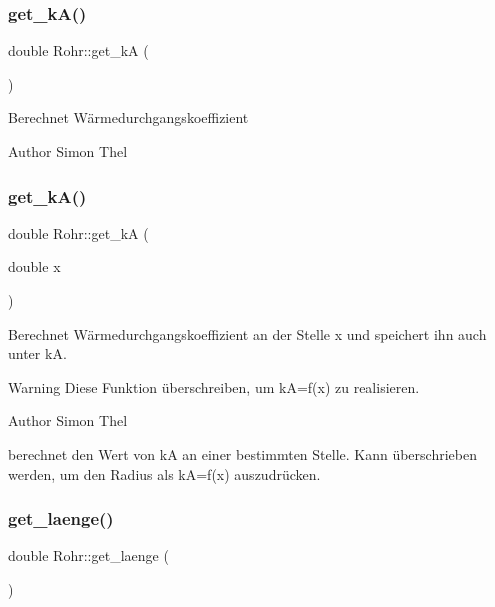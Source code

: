 \subsubsection{\texorpdfstring{get\+\_\+k\+A()}{get\_kA()}\hspace{0.1cm}{\footnotesize\ttfamily [1/2]}}
{\footnotesize\ttfamily double Rohr\+::get\+\_\+kA (\begin{DoxyParamCaption}{ }\end{DoxyParamCaption})}

Berechnet Wärmedurchgangskoeffizient \begin{DoxyAuthor}{Author}
Simon Thel 
\end{DoxyAuthor}
\mbox{\label{class_rohr_a07985e6f4a1d9dc8bfcfe2e5cc9f2a60}} 
\subsubsection{\texorpdfstring{get\+\_\+k\+A()}{get\_kA()}\hspace{0.1cm}{\footnotesize\ttfamily [2/2]}}
{\footnotesize\ttfamily double Rohr\+::get\+\_\+kA (\begin{DoxyParamCaption}\item[{double}]{x }\end{DoxyParamCaption})}



Berechnet Wärmedurchgangskoeffizient an der Stelle x und speichert ihn auch unter kA. 

\begin{DoxyWarning}{Warning}
Diese Funktion überschreiben, um kA=f(x) zu realisieren. 
\end{DoxyWarning}
\begin{DoxyAuthor}{Author}
Simon Thel 
\end{DoxyAuthor}
berechnet den Wert von kA an einer bestimmten Stelle. Kann überschrieben werden, um den Radius als kA=f(x) auszudrücken.\mbox{\label{class_rohr_a191d4b81fcdfc02f9433effdc1fade81}} 
\subsubsection{\texorpdfstring{get\+\_\+laenge()}{get\_laenge()}}
{\footnotesize\ttfamily double Rohr\+::get\+\_\+laenge (\begin{DoxyParamCaption}{ }\end{DoxyParamCaption})}

